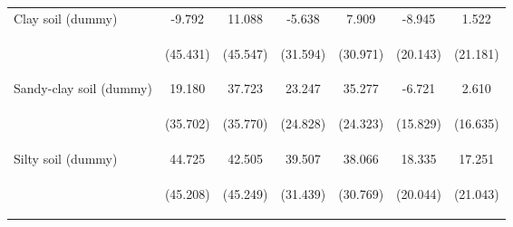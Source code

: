 \begin{center}
\begin{tabular}{lcccccc}
Clay soil (dummy) & -9.792 & 11.088 & -5.638 & 7.909 & -8.945 & 1.522 \\
\vspace{4pt} & \begin{footnotesize}(45.431)\end{footnotesize} & \begin{footnotesize}(45.547)\end{footnotesize} & \begin{footnotesize}(31.594)\end{footnotesize} & \begin{footnotesize}(30.971)\end{footnotesize} & \begin{footnotesize}(20.143)\end{footnotesize} & \begin{footnotesize}(21.181)\end{footnotesize} \\
Sandy-clay soil (dummy) & 19.180 & 37.723 & 23.247 & 35.277 & -6.721 & 2.610 \\
\vspace{4pt} & \begin{footnotesize}(35.702)\end{footnotesize} & \begin{footnotesize}(35.770)\end{footnotesize} & \begin{footnotesize}(24.828)\end{footnotesize} & \begin{footnotesize}(24.323)\end{footnotesize} & \begin{footnotesize}(15.829)\end{footnotesize} & \begin{footnotesize}(16.635)\end{footnotesize} \\
Silty soil (dummy) & 44.725 & 42.505 & 39.507 & 38.066 & 18.335 & 17.251 \\
\vspace{4pt} & \begin{footnotesize}(45.208)\end{footnotesize} & \begin{footnotesize}(45.249)\end{footnotesize} & \begin{footnotesize}(31.439)\end{footnotesize} & \begin{footnotesize}(30.769)\end{footnotesize} & \begin{footnotesize}(20.044)\end{footnotesize} & \begin{footnotesize}(21.043)\end{footnotesize} \\

\end{tabular}
\end{center}
